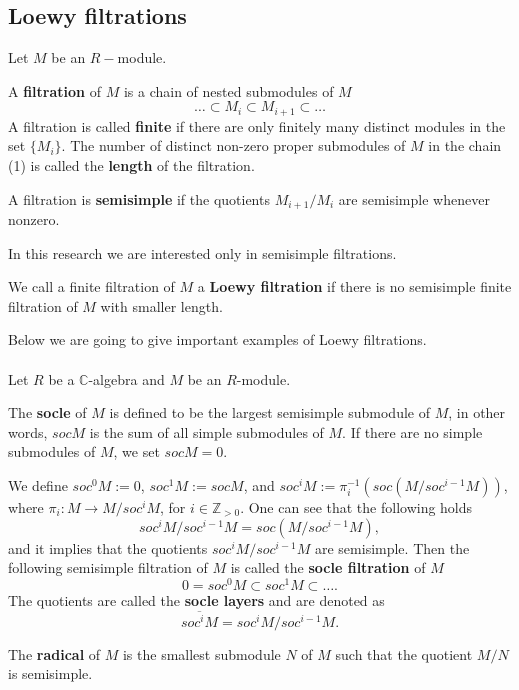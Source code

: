 \subsection{Loewy filtrations}
Let $M$ be an $R-$module.
\begin{defn}
A \textbf{filtration} of $M$ is a chain of nested submodules of $M$
\begin{equation}
\dots \subset M_i\subset M_{i+1} \subset \dots
\end{equation}
A filtration is called \textbf{finite} if there are only finitely many distinct modules in the set $\{M_i\}$. The number of distinct non-zero proper submodules of $M$ in the chain (1) is called the \textbf{length} of the filtration.
\end{defn}
\begin{defn}
A filtration is \textbf{semisimple} if the quotients $M_{i+1}/M_{i}$ are semisimple whenever nonzero.
\end{defn}
In this research we are interested only in semisimple filtrations.\\ 
\begin{defn}
We call a finite filtration of $M$ a \textbf{Loewy filtration} if there is no semisimple finite filtration of $M$ with smaller length.
\end{defn}
Below we are going to give important examples of Loewy filtrations.
\\ \\Let $R$ be a $\mathbb{C}$-algebra and $M$ be an $R$-module. 
\begin{defn}
The \textbf{socle} of $M$ is defined to be the largest semisimple submodule of $M$, in other words, $soc M$ is the sum of all simple submodules of $M$. If there are no simple submodules of $M$, we set $socM=0$.
\end{defn}
We define $soc^0 M:=0$, $soc^1 M:=socM$, and $soc^iM:= \pi_{i}^{-1}(soc(M/soc^{i-1}M))$, where $\pi_{i}:M \rightarrow M/soc^{i}M$, for $i\in\mathbb{Z}_{>0}$. One can see that the following holds $$soc^{i}M/soc^{i-1}M=soc(M/soc^{i-1}M),$$ and it implies that the quotients $soc^{i}M/soc^{i-1}M$ are semisimple. Then the following semisimple filtration of $M$ is called the \textbf{socle filtration} of $M$
$$0=soc^0M\subset soc^1M\subset \dots .$$
The quotients are called the\textbf{ socle layers} and are denoted as
$$\overline{soc^i M}=soc^{i}M/soc^{i-1}M.$$
\begin{defn}
The \textbf{radical} of $M$ is the smallest submodule $N$ of $M$ such that the quotient $M/N$ is semisimple.
\end{defn}
